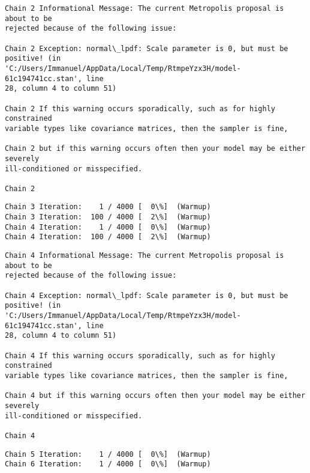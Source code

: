 \documentclass[11pt]{article}
\begin{document}
    \begin{Verbatim}[commandchars=\\\{\}]
Chain 2 Informational Message: The current Metropolis proposal is about to be
rejected because of the following issue:

Chain 2 Exception: normal\_lpdf: Scale parameter is 0, but must be positive! (in
'C:/Users/Immanuel/AppData/Local/Temp/RtmpeYzx3H/model-61c194741cc.stan', line
28, column 4 to column 51)

Chain 2 If this warning occurs sporadically, such as for highly constrained
variable types like covariance matrices, then the sampler is fine,

Chain 2 but if this warning occurs often then your model may be either severely
ill-conditioned or misspecified.

Chain 2

    \end{Verbatim}

    \begin{Verbatim}[commandchars=\\\{\}]
Chain 3 Iteration:    1 / 4000 [  0\%]  (Warmup)
Chain 3 Iteration:  100 / 4000 [  2\%]  (Warmup)
Chain 4 Iteration:    1 / 4000 [  0\%]  (Warmup)
Chain 4 Iteration:  100 / 4000 [  2\%]  (Warmup)
    \end{Verbatim}

    \begin{Verbatim}[commandchars=\\\{\}]
Chain 4 Informational Message: The current Metropolis proposal is about to be
rejected because of the following issue:

Chain 4 Exception: normal\_lpdf: Scale parameter is 0, but must be positive! (in
'C:/Users/Immanuel/AppData/Local/Temp/RtmpeYzx3H/model-61c194741cc.stan', line
28, column 4 to column 51)

Chain 4 If this warning occurs sporadically, such as for highly constrained
variable types like covariance matrices, then the sampler is fine,

Chain 4 but if this warning occurs often then your model may be either severely
ill-conditioned or misspecified.

Chain 4

    \end{Verbatim}

    \begin{Verbatim}[commandchars=\\\{\}]
Chain 5 Iteration:    1 / 4000 [  0\%]  (Warmup)
Chain 6 Iteration:    1 / 4000 [  0\%]  (Warmup)
    \end{Verbatim}
\end{document}
